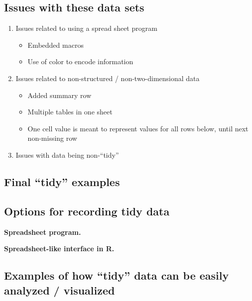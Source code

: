 \documentclass[]{tufte-book}
\providecommand{\tightlist}{%
  \setlength{\itemsep}{0pt}\setlength{\parskip}{0pt}}
\begin{document}
\hypertarget{issues-with-these-data-sets}{%
\subsection{Issues with these data sets}\label{issues-with-these-data-sets}}

\begin{enumerate}
\def\labelenumi{\arabic{enumi}.}
\tightlist
\item
  Issues related to using a spread sheet program

  \begin{itemize}
  \tightlist
  \item
    Embedded macros
  \item
    Use of color to encode information
  \end{itemize}
\item
  Issues related to non-structured / non-two-dimensional data

  \begin{itemize}
  \tightlist
  \item
    Added summary row
  \item
    Multiple tables in one sheet
  \item
    One cell value is meant to represent values for all rows below, until next
    non-missing row
  \end{itemize}
\item
  Issues with data being non-``tidy''
\end{enumerate}

\hypertarget{final-tidy-examples}{%
\subsection{Final ``tidy'' examples}\label{final-tidy-examples}}

\hypertarget{options-for-recording-tidy-data}{%
\subsection{Options for recording tidy data}\label{options-for-recording-tidy-data}}

\textbf{Spreadsheet program.}

\textbf{Spreadsheet-like interface in R.}

\hypertarget{examples-of-how-tidy-data-can-be-easily-analyzed-visualized}{%
\subsection{Examples of how ``tidy'' data can be easily analyzed / visualized}\label{examples-of-how-tidy-data-can-be-easily-analyzed-visualized}}
\end{document}
